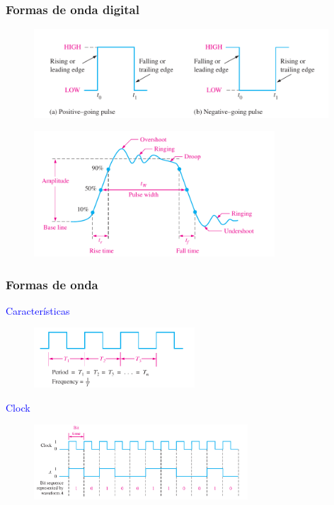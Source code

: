 \documentclass[10.5pt,scale=1.0,t,aspectratio=169,hyperref={pdfpagelabels=false}]{beamer}
\begin{document}
\begin{frame}
	\frametitle{Formas de onda digital}
	\vspace{-0.1in}
\begin{figure}
	\centering
	\includegraphics[width=11cm]{FormasOndas}
\end{figure}
\begin{figure}
	\centering
	\includegraphics[width=9cm]{PulsoNoIdeal}
\end{figure}	
\end{frame}

\begin{frame}
	\frametitle{Formas de onda}
	\textcolor{blue}{\large Características} \\
\begin{figure}
	\centering
	\includegraphics[width=6cm]{PeriodoFrecuencia}
\end{figure}
\textcolor{blue}{\large Clock} \\
\begin{figure}
	\centering
	\includegraphics[width=8cm]{Clock}
\end{figure}	
\end{frame}
\end{document}
